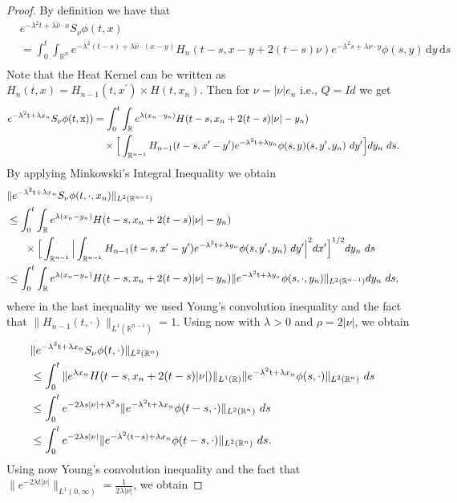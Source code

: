 \documentclass[10pt,a4paper]{amsart}
\newcommand{\R}{\mathbb{R}}
\newcommand{\dd}{\mathrm{d}}
\newcommand{\tm}{\mathrm{t}}
\newcommand{\x}{\mathrm{x}}
\begin{document}
\iffalse
\begin{proof}
By definition we have that
\begin{align*}
&     e^{-\lambda^2 t + \lambda \hat{\nu} \cdot x} S_\nu \phi(t,x) \\
          &= \int_0^t \int_{\R^n} e^{-\lambda^2 (t - s) + \lambda \hat{\nu} \cdot (x - y)} H_n(t-s,x-y + 2(t-s){\nu}) e^{-\lambda^2 s + \lambda \hat{\nu} \cdot y}\phi(s, y) \,\dd y \,\dd s\\
\end{align*}
Note that the Heat Kernel can be written as $H_n(t,x)=H_{n-1}(t,x^\prime) \times H(t,x_n)$. 
Then for {${\nu}=|{\nu}| e_n$} i.e., $Q=Id$ we get
\begin{align*}
    e^{-\lambda^2 \tm + \lambda x_n} S_\nu \phi(t,\x))&= \int_0^t \int_{\R} e^{\lambda (x_n-y_n)}H(t-s,x_n+2(t-s)|{\nu}|-y_n) \cr &\quad\times\Big[\int_{\R^{n-1}} H_{n-1}(t-s,x^\prime-y^\prime) e^{-\lambda^2 \tm + \lambda y_n}\phi(s, y)(s, y^\prime, y_n) ~dy^\prime \Big] dy_n ~ds.
\end{align*}
By applying Minkowski's Integral Inequality we obtain
\begin{align*}
   & \|e^{-\lambda^2 \tm + \lambda x_n} S_\nu \phi(t,\cdot,x_n)\|_{L^2(\R^{n-1})}\cr
    &\leq \int_0^t \int_{\R} e^{\lambda (x_n-y_n)}  H(t-s,x_n+2(t-s)|{\nu}|-y_n)\cr &~~~~~\times\Big[  \int_{\R^{n-1}} \Big| \int_{\R^{n-1}} H_{n-1}(t-s,x^\prime-y^\prime) e^{-\lambda^2 \tm + \lambda y_n}\phi(s, y^\prime, y_n) ~dy^\prime  \Big|^2 dx^\prime  \Big]^{1/2} dy_n ~ds\cr
    &\leq \int_0^t \int_{\R} e^{\lambda (x_n-y_n)}  H(t-s,x_n+2(t-s)|{\nu}|-y_n)\|e^{-\lambda^2 \tm + \lambda y_n}\phi(s, \cdot, y_n)\|_{L^2(\R^{n-1})}  dy_n ~ds,
\end{align*}
where in the last inequality we used Young's convolution inequality and the fact that $\|H_{n-1}(t, \cdot)\|_{L^1(\R^{n-1})}=1$. 
Using now  with $\lambda > 0$ and $\rho = 2 |\nu|$, we obtain
\begin{align*}
   & \|e^{-\lambda^2 \tm + \lambda x_n} S_\nu \phi(t,\cdot)\|_{L^2(\R^{n})}\cr
    &\leq \int_0^t \|e^{\lambda x_n}  H(t-s,x_n+2(t-s)|{\nu}|)\|_{L^1(\R)}\|e^{-\lambda^2 \tm + \lambda x_n}\phi(s, \cdot)\|_{L^2(\R^{n})}   ~ds\cr
        &\leq \int_0^t  e^{-2\lambda s |\nu|+\lambda^2 s} \|e^{-\lambda^2 \tm + \lambda x_n}\phi(t-s, \cdot)\|_{L^2(\R^{n})}   ~ds\cr
        &\leq \int_{0}^t  e^{-2\lambda s |\nu|} \|e^{-\lambda^2 (\tm-s) + \lambda x_n}\phi(t-s, \cdot)\|_{L^2(\R^{n})}   ~ds.
\end{align*}
Using now Young's convolution inequality and the fact that $\|e^{-2\lambda t |\nu|}\|_{L^1(0,\infty)}=\frac{1}{2\lambda  |\nu|}$, we obtain 

\end{proof}
\end{document}
